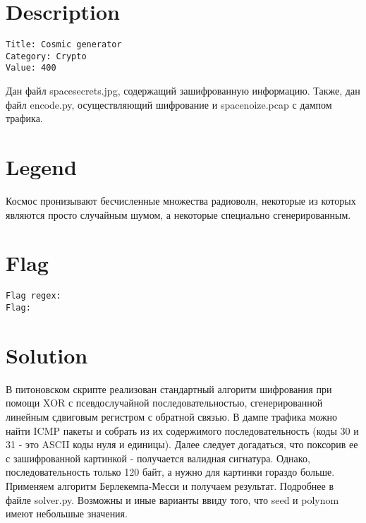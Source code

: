 \documentclass{article}
\begin{document}
	
	\renewcommand{\contentsname}{Contents}
	
	\section{Description}
	
	\tt Title: Cosmic generator \\
	
	\tt Category: Crypto \\
	
	\tt Value: 400
	
	\begin{framed}
		Дан файл spacesecrets.jpg, содержащий зашифрованную информацию. Также, дан файл encode.py, осуществляющий шифрование и spacenoize.pcap с дампом трафика.
	\end{framed}
	
	\section{Legend}
	
	Космос пронизывают бесчисленные множества радиоволн, некоторые из которых являются просто случайным шумом, а некоторые специально сгенерированным.
	
	\section{Flag}
	
	\tt Flag regex: 
	 \\
	
	\tt Flag: 
	
	\section{Solution}
	
	В питоновском скрипте реализован стандартный алгоритм шифрования при помощи XOR с псевдослучайной последовательностью, сгенерированной линейным сдвиговым регистром с обратной связью. В дампе трафика можно найти ICMP пакеты и собрать из их содержимого последовательность (коды 30 и 31 - это ASCII коды нуля и единицы). Далее следует догадаться, что поксорив ее с зашифрованной картинкой - получается валидная сигнатура. Однако, последовательность только 120 байт, а нужно для картинки гораздо больше. Применяем алгоритм Берлекемпа-Месси и получаем результат. Подробнее в файле solver.py. Возможны и иные варианты ввиду того, что seed и polynom имеют небольшые значения.
	
\end{document}
